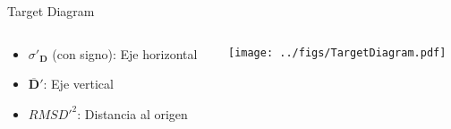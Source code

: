 \documentclass[aspectratio=169, usenames,svgnames,dvipsnames]{beamer}
\begin{document}
\begin{frame}[label={sec:org3e8b329}]{Target Diagram}
\begin{columns}
\begin{column}{0.3\columnwidth}
\begin{itemize}
\item \(\sigma'_{\mathbf{D}}\) (con signo): Eje horizontal
\item \(\overline{\mathbf{D}}'\): Eje vertical
\item \(RMSD'^2\): Distancia al origen
\end{itemize}
\end{column}

\begin{column}{0.7\columnwidth}
\begin{center}
\texttt{[image: ../figs/TargetDiagram.pdf]}
\end{center}
\end{column}
\end{columns}
\end{frame}
\end{document}
